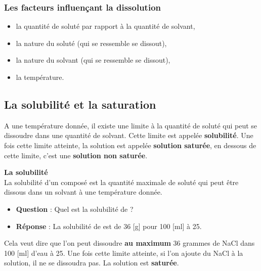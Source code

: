 \documentclass[
  11pt,
  french,
  a4paper,
  openany]{book}
\providecommand{\tightlist}{%
  \setlength{\itemsep}{0pt}\setlength{\parskip}{0pt}}
\begin{document}
\hypertarget{les-facteurs-influenuxe7ant-la-dissolution}{%
\subsubsection{Les facteurs influençant la dissolution}\label{les-facteurs-influenuxe7ant-la-dissolution}}

\begin{itemize}
\tightlist
\item
  la quantité de soluté par rapport à la quantité de solvant,
\item
  la nature du soluté (qui se ressemble se dissout),
\item
  la nature du solvant (qui se ressemble se dissout),
\item
  la température.
\end{itemize}

\hypertarget{la-solubilituxe9-et-la-saturation}{%
\subsection{La solubilité et la saturation}\label{la-solubilituxe9-et-la-saturation}}

A une température donnée, il existe une limite à la quantité de soluté qui peut se dissoudre dans une quantité de solvant. Cette limite est appelée \textbf{solubilité}. Une fois cette limite atteinte, la solution est appelée \textbf{solution saturée}, en dessous de cette limite, c'est une \textbf{solution non saturée}.

\begin{tcolorbox}
\textbf{La solubilité}\\
La solubilité d'un composé est la quantité maximale de soluté qui peut être dissous dans un solvant à une température donnée.

\end{tcolorbox}

\begin{itemize}
\tightlist
\item
  \textbf{Question} : Quel est la solubilité de ?
\item
  \textbf{Réponse} : La solubilité de  est de 36 {[}g{]} pour 100 {[}ml{]} à 25\celsius.
\end{itemize}

Cela veut dire que l'on peut dissoudre \textbf{au maximum} 36 grammes de NaCl dans 100 {[}ml{]} d'eau à 25\celsius. Une fois cette limite atteinte, si l'on ajoute du NaCl à la solution, il ne se dissoudra pas. La solution est \textbf{saturée}.
\end{document}
